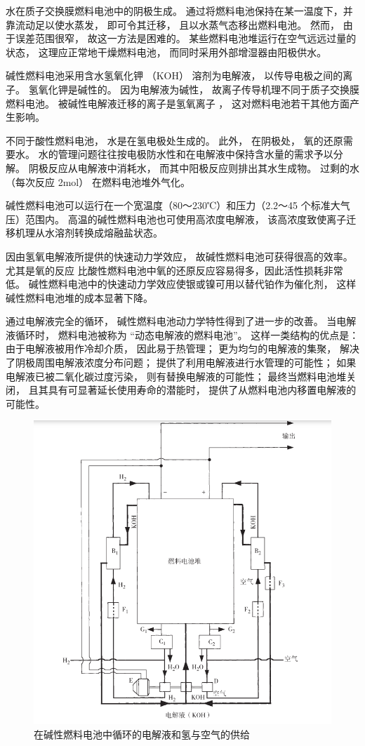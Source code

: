 \documentclass[UTF8,a4paper,11pt]{article}
\begin{document}
水在质子交换膜燃料电池中的阴极生成。 通过将燃料电池保持在某一温度下，并靠流动足以使水蒸发， 即可令其迁移， 且以水蒸气态移出燃料电池。 然而， 由于误差范围很窄， 故这一方法是困难的。 某些燃料电池堆运行在空气远远过量的状态， 这理应正常地干燥燃料电池， 而同时采用外部增湿器由阳极供水。
 
碱性燃料电池采用含水氢氧化钾 （KOH） 溶剂为电解液， 以传导电极之间的离子。 氢氧化钾是碱性的。 因为电解液为碱性， 故离子传导机理不同于质子交换膜燃料电池。 被碱性电解液迁移的离子是氢氧离子 ， 这对燃料电池若干其他方面产生影响。

不同于酸性燃料电池， 水是在氢电极处生成的。 此外， 在阴极处， 氧的还原需要水。 水的管理问题往往按电极防水性和在电解液中保持含水量的需求予以分解。 阴极反应从电解液中消耗水， 而其中阳极反应则排出其水生成物。 过剩的水 （每次反应 2mol） 在燃料电池堆外气化。

碱性燃料电池可以运行在一个宽温度（80～230℃）和压力（2.2～45 个标准大气压）范围内。 高温的碱性燃料电池也可使用高浓度电解液， 该高浓度致使离子迁移机理从水溶剂转换成熔融盐状态。

因由氢氧电解液所提供的快速动力学效应， 故碱性燃料电池可获得很高的效率。 尤其是氧的反应 比酸性燃料电池中氧的还原反应容易得多，因此活性损耗非常低。 碱性燃料电池中的快速动力学效应使银或镍可用以替代铂作为催化剂， 这样碱性燃料电池堆的成本显著下降。

通过电解液完全的循环， 碱性燃料电池动力学特性得到了进一步的改善。 当电解液循环时， 燃料电池被称为 “动态电解液的燃料电池”。 这样一类结构的优点是：由于电解液被用作冷却介质， 因此易于热管理； 更为均匀的电解液的集聚， 解决了阴极周围电解液浓度分布问题； 提供了利用电解液进行水管理的可能性； 如果电解液已被二氧化碳过度污染， 则有替换电解液的可能性； 最终当燃料电池堆关闭， 且其具有可显著延长使用寿命的潜能时， 提供了从燃料电池内移置电解液的可能性。

\begin{figure}[htbp]
\centering
\includegraphics[scale=0.75]{p5.png}
\caption{在碱性燃料电池中循环的电解液和氢与空气的供给}
\end{figure}
\end{document}
